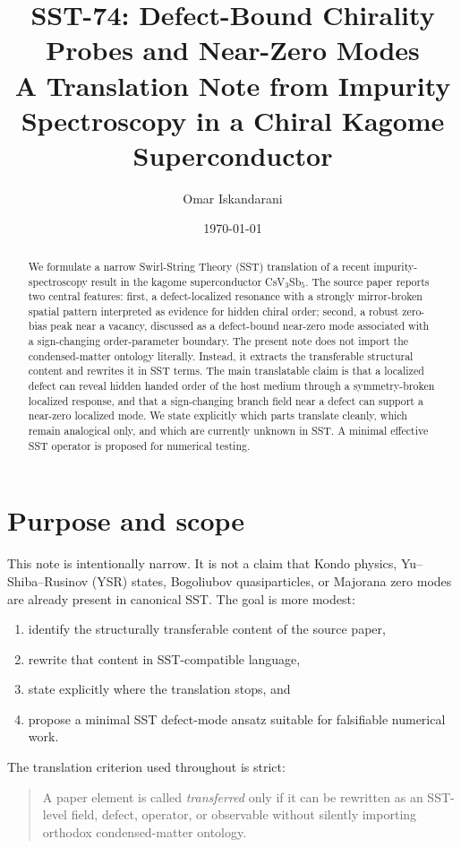 \documentclass[11pt]{article}
\title{SST-74: Defect-Bound Chirality Probes and Near-Zero Modes\\
\large A Translation Note from Impurity Spectroscopy in a Chiral Kagome Superconductor}
\author{Omar Iskandarani}
\date{\today}
\begin{document}
    \maketitle

    \begin{abstract}
        We formulate a narrow Swirl-String Theory (SST) translation of a recent impurity-spectroscopy result in the kagome superconductor CsV$_3$Sb$_5$. The source paper reports two central features: first, a defect-localized resonance with a strongly mirror-broken spatial pattern interpreted as evidence for hidden chiral order; second, a robust zero-bias peak near a vacancy, discussed as a defect-bound near-zero mode associated with a sign-changing order-parameter boundary. The present note does not import the condensed-matter ontology literally. Instead, it extracts the transferable structural content and rewrites it in SST terms. The main translatable claim is that a localized defect can reveal hidden handed order of the host medium through a symmetry-broken localized response, and that a sign-changing branch field near a defect can support a near-zero localized mode. We state explicitly which parts translate cleanly, which remain analogical only, and which are currently unknown in SST. A minimal effective SST operator is proposed for numerical testing.
    \end{abstract}

    \section{Purpose and scope}
        This note is intentionally narrow. It is not a claim that Kondo physics, Yu--Shiba--Rusinov (YSR) states, Bogoliubov quasiparticles, or Majorana zero modes are already present in canonical SST. The goal is more modest:
        \begin{enumerate}[label=\arabic*.]
    \item identify the structurally transferable content of the source paper,
    \item rewrite that content in SST-compatible language,
    \item state explicitly where the translation stops, and
    \item propose a minimal SST defect-mode ansatz suitable for falsifiable numerical work.
        \end{enumerate}

        The translation criterion used throughout is strict:
        \begin{quote}
            A paper element is called \emph{transferred} only if it can be rewritten as an SST-level field, defect, operator, or observable without silently importing orthodox condensed-matter ontology.
        \end{quote}
\end{document}
